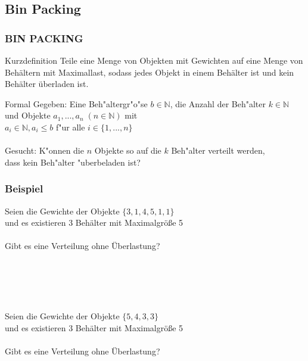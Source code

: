 \subsection{Bin Packing}
\begin{frame}
	\frametitle{BIN PACKING}
	\begin{block}{Kurzdefinition}
	Teile eine Menge von Objekten mit Gewichten auf eine Menge von Behältern mit Maximallast, sodass jedes Objekt in einem Behälter ist und kein Behälter überladen ist.
	\end{block}
	\begin{block}{Formal}
	Gegeben: Eine Beh"altergr"o"se $b \in \mathbb{N}$, die Anzahl der
	Beh"alter $k \in \mathbb{N}$\\
	und Objekte $a_1,...,a_n \; (n \in \mathbb{N})$ mit\\
	$a_i \in \mathbb{N}, a_i \leq b$ f"ur alle $i \in \{1,...,n\}$\\~\\
	Gesucht: K"onnen die $n$ Objekte so auf die $k$ Beh"alter verteilt
	werden,\\
	dass kein Beh"alter "uberbeladen ist?\\
	\end{block}
\end{frame}
\begin{frame}
	\frametitle{Beispiel}
	Seien die Gewichte der Objekte $\{3, 1, 4, 5, 1, 1\}$~\\
	und es existieren 3 Behälter mit Maximalgröße 5~\\~\\
	Gibt es eine Verteilung ohne Überlastung?~\\~\\~\\~\\~\\~\\
	Seien die Gewichte der Objekte $\{5, 4, 3, 3\}$~\\
	und es existieren 3 Behälter mit Maximalgröße 5~\\~\\
	Gibt es eine Verteilung ohne Überlastung?
\end{frame}


